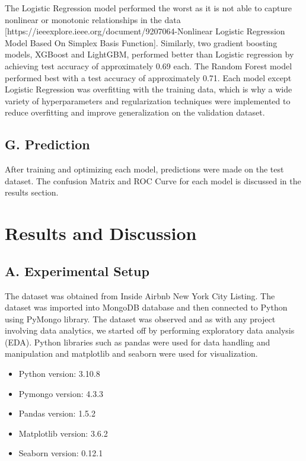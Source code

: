 \documentclass[conference]{IEEEtran}
\begin{document}
The Logistic Regression model performed the worst as it is not able to capture nonlinear or monotonic relationships in the data [https://ieeexplore.ieee.org/document/9207064-Nonlinear Logistic Regression Model Based On Simplex Basis Function]. Similarly, two gradient boosting models, XGBoost and LightGBM, performed better than Logistic regression by achieving test accuracy of approximately  0.69 each. The Random Forest model performed best with a  test accuracy of approximately  0.71. Each model except Logistic Regression was overfitting with the training data, which is why a wide variety of hyperparameters and regularization techniques were implemented to reduce overfitting and improve generalization on the validation dataset. \newline

\subsection*{\centering G. Prediction}
After training and optimizing each model, predictions were made on the test dataset. The confusion Matrix and ROC Curve for each model is discussed in the results section.\newline


\section{Results and Discussion}

\subsection*{\centering A. Experimental Setup}
The dataset was obtained from Inside Airbnb New York City Listing. The dataset was imported into MongoDB database and then connected to Python using PyMongo library. The dataset was observed and as with any project involving data analytics, we started off by performing exploratory data analysis (EDA). Python libraries such as pandas were used for data handling and manipulation and matplotlib and seaborn were used for visualization.

\begin{itemize}
\item 	Python version: 3.10.8
\item 	Pymongo version: 4.3.3
\item 	Pandas version: 1.5.2
\item 	Matplotlib version: 3.6.2
\item 	Seaborn version: 0.12.1\newline
\end{itemize}
	
\end{document}

